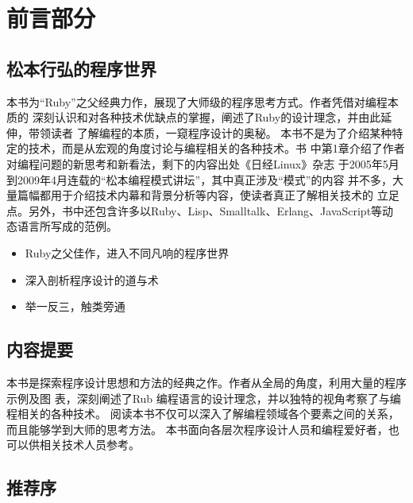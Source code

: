 \documentclass[11pt]{ctexart}
\author{mac}
\date{\today}
\title{}
\begin{document}
\tableofcontents

\section{前言部分}
\label{sec:orgd52019e}
\begin{LaTeX}
\newpage
\end{LaTeX}
\subsection{松本行弘的程序世界}
\label{sec:orgabfdd13}

本书为“Ruby”之父经典力作，展现了大师级的程序思考方式。作者凭借对编程本质的
深刻认识和对各种技术优缺点的掌握，阐述了Ruby的设计理念，并由此延伸，带领读者
了解编程的本质，一窥程序设计的奥秘。
本书不是为了介绍某种特定的技术，而是从宏观的角度讨论与编程相关的各种技术。书
中第1章介绍了作者对编程问题的新思考和新看法，剩下的内容出处《日经Linux》杂志
于2005年5月到2009年4月连载的“松本编程模式讲坛”，其中真正涉及“模式”的内容
并不多，大量篇幅都用于介绍技术内幕和背景分析等内容，使读者真正了解相关技术的
立足点。另外，书中还包含许多以Ruby、Lisp、Smalltalk、Erlang、JavaScript等动
态语言所写成的范例。

\begin{itemize}
\item Ruby之父佳作，进入不同凡响的程序世界
\item 深入剖析程序设计的道与术
\item 举一反三，触类旁通
\end{itemize}
\begin{LaTeX}
\newpage
\end{LaTeX}
\subsection{内容提要}
\label{sec:orgb8c38ec}

本书是探索程序设计思想和方法的经典之作。作者从全局的角度，利用大量的程序示例及图
表，深刻阐述了Rub 编程语言的设计理念，并以独特的视角考察了与编程相关的各种技术。
阅读本书不仅可以深入了解编程领域各个要素之间的关系，而且能够学到大师的思考方法。
本书面向各层次程序设计人员和编程爱好者，也可以供相关技术人员参考。

\begin{LaTeX}
\newpage
\end{LaTeX}

\subsection{推荐序}
\label{sec:org1710017}
\end{document}
